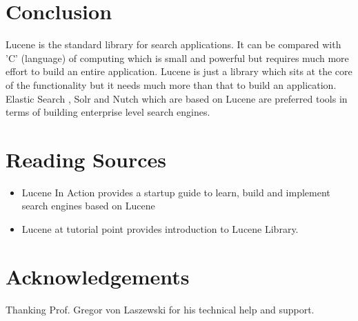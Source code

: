 \documentclass[9pt,twocolumn,twoside]{../../styles/osajnl}
\begin{document}
\section{Conclusion}
Lucene is the standard library for search applications. It can be compared with 'C' (language) of computing which is small and powerful but requires much more effort to build an entire application. Lucene is just a library which sits at the core of the functionality but it needs much more than that to build an application. Elastic Search , Solr and Nutch which are based on Lucene are preferred tools in terms of building enterprise level search engines. 

\section{Reading Sources}

\begin{itemize}
\item Lucene In Action \cite{lucene-book} provides a startup guide to
learn, build and implement search engines based on Lucene 
\item Lucene at tutorial point \cite{www-lucene-tp} provides introduction
 to Lucene Library.
\end{itemize}



\section*{Acknowledgements}

Thanking Prof. Gregor von Laszewski for his technical help and support.




\end{document}
